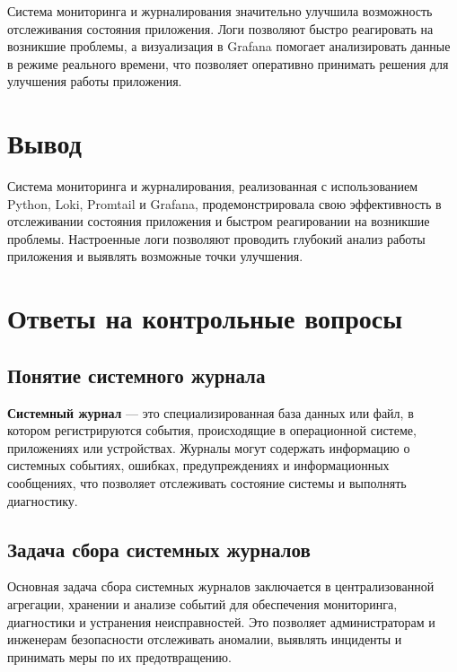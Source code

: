 Система мониторинга и журналирования значительно улучшила возможность
отслеживания состояния приложения.
Логи позволяют быстро реагировать на возникшие проблемы,
а визуализация в Grafana помогает анализировать данные
в режиме реального времени,
что позволяет оперативно принимать решения
для улучшения работы приложения.

\clearpage

\section*{Вывод}

Система мониторинга и журналирования,
реализованная с использованием Python, Loki, Promtail и Grafana,
продемонстрировала свою эффективность в отслеживании состояния приложения
и быстром реагировании на возникшие проблемы.
Настроенные логи позволяют проводить глубокий анализ работы приложения
и выявлять возможные точки улучшения.

\clearpage

\section*{Ответы на контрольные вопросы}

\subsection*{Понятие системного журнала}

\textbf{Системный журнал} --- это специализированная база данных или файл,
в котором регистрируются события, происходящие в операционной системе,
приложениях или устройствах.
Журналы могут содержать информацию о системных событиях, ошибках,
предупреждениях и информационных сообщениях,
что позволяет отслеживать состояние системы и выполнять диагностику.

\subsection*{Задача сбора системных журналов}

Основная задача сбора системных журналов заключается
в централизованной агрегации, хранении
и анализе событий для обеспечения мониторинга,
диагностики и устранения неисправностей.
Это позволяет администраторам и инженерам безопасности отслеживать аномалии,
выявлять инциденты и принимать меры по их предотвращению.

